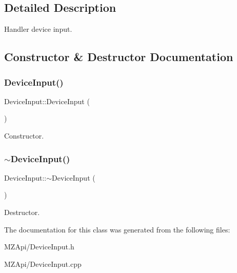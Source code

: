 \subsection{Detailed Description}
Handler device input. 

\subsection{Constructor \& Destructor Documentation}
\mbox{\label{classDeviceInput_a5a5d144c0a4a2d0fedfd85fcb687a716}} 
\subsubsection{\texorpdfstring{Device\+Input()}{DeviceInput()}}
{\footnotesize\ttfamily Device\+Input\+::\+Device\+Input (\begin{DoxyParamCaption}{ }\end{DoxyParamCaption})}

Constructor. \mbox{\label{classDeviceInput_a6c06d020cca58b3d4763e1717382b1a8}} 
\subsubsection{\texorpdfstring{$\sim$\+Device\+Input()}{~DeviceInput()}}
{\footnotesize\ttfamily Device\+Input\+::$\sim$\+Device\+Input (\begin{DoxyParamCaption}{ }\end{DoxyParamCaption})}

Destructor. 

The documentation for this class was generated from the following files\+:\begin{DoxyCompactItemize}
\item 
M\+Z\+Api/Device\+Input.\+h\item 
M\+Z\+Api/Device\+Input.\+cpp\end{DoxyCompactItemize}
